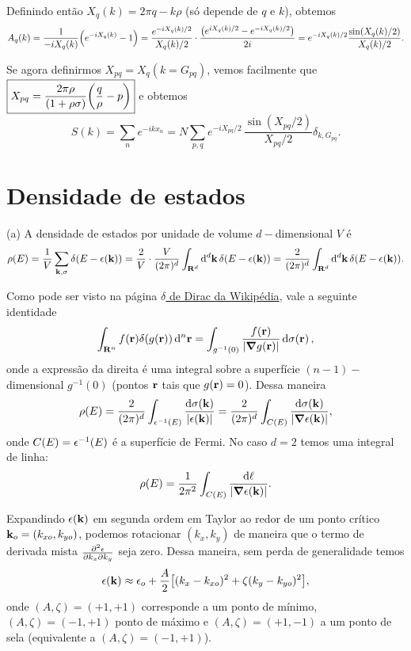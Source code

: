 \documentclass[a4paper,10pt]{article}
\begin{document}
Definindo então $X_{q}(k) = 2\pi q - k \rho$ (só depende de $q$ e $k$), obtemos
$$
A_q(k) = \frac{1}{-i X_q(k)} \qty(e^{-i X_q(k)} - 1) =
\frac{e^{-i X_q(k)/2}}{X_q(k)/2} \cdot \frac{\qty(e^{iX_q(k)/2} - e^{-iX_q(k)/2})}{2i} =
e^{-iX_q(k) / 2} \frac{\sin(X_q(k)/2)}{X_q(k)/2}.
$$

Se agora definirmos $X_{pq} = X_q(k = G_{pq})$, vemos facilmente que $\boxed{ X_{pq} = \frac{2\pi \rho}{(1+\rho\sigma)}\qty(\frac{q}{\rho} - p) }$ e obtemos
$$
\boxed{ S(k) = \sum_{n} e^{-ikx_n} = N \sum_{p,q} e^{-i X_{pq}/2} \, \frac{\sin(X_{pq}/2)}{X_{pq}/2} \delta_{k, G_{pq}}. }
$$



\pagebreak

\section{Densidade de estados}

(a) A densidade de estados por unidade de volume $d-$dimensional $V$ é
$$
\rho(E) = \frac{1}{V} \sum_{\vb{k}, \sigma} \delta(E - \epsilon(\vb{k})) = \frac{2}{V} \cdot \frac{V}{(2\pi)^d} \int_{\vb{R}^d} \dd[d]{\vb{k}} \delta(E - \epsilon(\vb{k})) = \frac{2}{(2\pi)^d} \int_{\vb{R}^d} \dd[d]{\vb{k}} \delta(E - \epsilon(\vb{k})).
$$

Como pode ser visto na página \href{https://en.wikipedia.org/wiki/Dirac_delta_function#Properties}{$\delta$ de Dirac da Wikipédia}, vale a seguinte identidade
$$
\int_{\vb{R}^n} f(\vb{r}) \delta(g(\vb{r})) \dd[n]{\vb{r}} = \int_{g^{-1}(0)} \frac{f(\vb{r})}{\abs{\grad{g(\vb{r})}}} \dd{\sigma(\vb{r})},
$$
onde a expressão da direita é uma integral sobre a superfície $(n-1)-$dimensional $g^{-1}(0)$ (pontos $\vb{r}$ tais que $g(\vb{r}) = 0$). Dessa maneira
$$
\rho(E) = \frac{2}{(2\pi)^d} \int_{\epsilon^{-1}(E)} \frac{\dd{\sigma(\vb{k})}}{\abs{\epsilon(\vb{k})}} =
\frac{2}{(2\pi)^d} \int_{C(E)} \frac{\dd{\sigma(\vb{k})}}{\abs{\grad{\epsilon(\vb{k})}}},
$$
onde $C(E) = \epsilon^{-1}(E)$ é a superfície de Fermi. No caso $d = 2$ temos uma integral de linha:
$$
\rho(E) = \frac{1}{2\pi^2} \int_{C(E)} \frac{\dd{\ell}}{\abs{\grad{\epsilon(\vb{k})}}}.
$$

Expandindo $\epsilon(\vb{k})$ em segunda ordem em Taylor ao redor de um ponto crítico $\vb{k}_o = (k_{xo}, k_{yo})$, podemos rotacionar $(k_x, k_y)$ de maneira que o termo de derivada mista $\pdv{\epsilon}{k_x}{k_y}$ seja zero. Dessa maneira, sem perda de generalidade temos
$$
\epsilon(\vb{k}) \approx \epsilon_o + \frac{A}{2} \qty[(k_x - k_{xo})^2 + \zeta (k_y - k_{yo})^2],
$$
onde $(A, \zeta) = (+1, +1)$ corresponde a um ponto de mínimo, $(A, \zeta) = (-1, +1)$ ponto de máximo e $(A, \zeta) = (+1, -1)$ a um ponto de sela (equivalente a $(A, \zeta) = (-1, +1)$).
\end{document}
